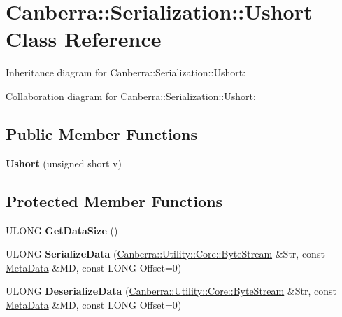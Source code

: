 \hypertarget{class_canberra_1_1_serialization_1_1_ushort}{}\section{Canberra\+:\+:Serialization\+:\+:Ushort Class Reference}
\label{class_canberra_1_1_serialization_1_1_ushort}


Inheritance diagram for Canberra\+:\+:Serialization\+:\+:Ushort\+:


Collaboration diagram for Canberra\+:\+:Serialization\+:\+:Ushort\+:
\subsection*{Public Member Functions}
\begin{DoxyCompactItemize}
\item 
\mbox{\label{class_canberra_1_1_serialization_1_1_ushort_a6461a7e54f9dee35a34c4d0c3e5ed318}} 
{\bfseries Ushort} (unsigned short v)
\end{DoxyCompactItemize}
\subsection*{Protected Member Functions}
\begin{DoxyCompactItemize}
\item 
\mbox{\label{class_canberra_1_1_serialization_1_1_ushort_ac4e1b20a94827a416f005f1770c9c3f3}} 
U\+L\+O\+NG {\bfseries Get\+Data\+Size} ()
\item 
\mbox{\label{class_canberra_1_1_serialization_1_1_ushort_a85e37a5465e41289c56530426f83584e}} 
U\+L\+O\+NG {\bfseries Serialize\+Data} (\hyperlink{class_canberra_1_1_utility_1_1_core_1_1_byte_stream}{Canberra\+::\+Utility\+::\+Core\+::\+Byte\+Stream} \&Str, const \hyperlink{class_canberra_1_1_serialization_1_1_meta_data}{Meta\+Data} \&MD, const L\+O\+NG Offset=0)
\item 
\mbox{\label{class_canberra_1_1_serialization_1_1_ushort_a856ed5a630898a03b40fc7d745165867}} 
U\+L\+O\+NG {\bfseries Deserialize\+Data} (\hyperlink{class_canberra_1_1_utility_1_1_core_1_1_byte_stream}{Canberra\+::\+Utility\+::\+Core\+::\+Byte\+Stream} \&Str, const \hyperlink{class_canberra_1_1_serialization_1_1_meta_data}{Meta\+Data} \&MD, const L\+O\+NG Offset=0)
\end{DoxyCompactItemize}

